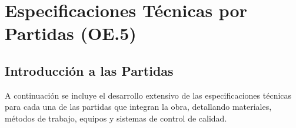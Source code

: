 \chapter{Especificaciones Técnicas por Partidas (OE.5)}

\section{Introducción a las Partidas}
A continuación se incluye el desarrollo extensivo de las especificaciones técnicas para cada una de las partidas que integran la obra, detallando materiales, métodos de trabajo, equipos y sistemas de control de calidad.







